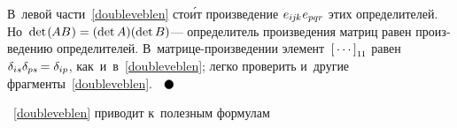 \begin{otherlanguage}{russian}
\vspace{-0.1em} \noindent В~левой части~\eqref{doubleveblen} сто\'{и}т произведение ${e_{i\hspace{-0.1ex}j\hspace{-0.1ex}k} \hspace{.1ex} e_{pqr}}$ этих определителей. Но~${\operatorname{det} \hspace{.2ex} (\hspace{-0.1ex}AB\hspace{.1ex}) = (\operatorname{det} A)(\operatorname{det} B)}$\:--- определитель произведения матриц равен произведению определителей. В~матрице\hbox{-}произведении элемент~${\left[{\,\cdots\,}\right]}_{1\hspace{-0.12ex}1}$ равен~${\delta_{is} \delta_{ps} \hspace{-0.2ex} = \delta_{ip}}$, как~и~в~\eqref{doubleveblen}; легко проверить и~другие фрагменты~\eqref{doubleveblen}.
${ \hspace{.6em}
\tikz[baseline=-0.6ex] \draw [color=black, fill=black] (0, 0) circle (.8ex); }$

~\eqref{doubleveblen} приводит к~полезным формулам


\end{otherlanguage}
